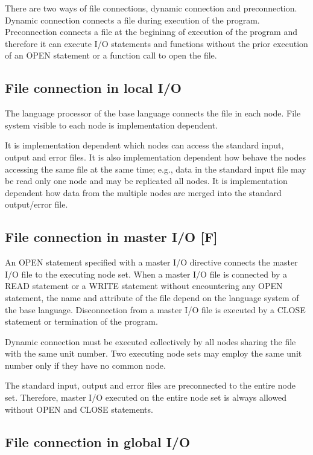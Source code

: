  There are two ways of file connections, dynamic connection and
  preconnection.
  Dynamic connection connects a file during execution of the program.
  Preconnection connects a file at the begininng of execution of the
  program and therefore it can execute I/O statements and functions
  without the prior execution of an OPEN statement or a function call to
  open the file.

  \subsection{File connection in local I/O}

  The language processor of the base language connects the file in each
  node.
  File system visible to each node is implementation dependent.

  It is implementation dependent which nodes can access the standard
  input, output and error files.
  It is also implementation dependent how behave the nodes accessing the
  same file at the same time; e.g., data in the standard input file may
  be read only one node and may be replicated all nodes.
  It is implementation dependent how data from the multiple nodes are
  merged into the standard output/error file.
  
  \subsection{File connection in master I/O [F]}

  An OPEN statement specified with a master I/O directive connects the
  master I/O file to the executing node set.
  When a master I/O file is connected by a READ statement or a WRITE
  statement without encountering any OPEN statement, the name and
  attribute of the file depend on the language system of the base
  language.
  Disconnection from a master I/O file is executed by a CLOSE statement
  or termination of the program.

  Dynamic connection must be executed collectively by all nodes sharing
  the file with the same unit number.
  Two executing node sets may employ the same unit number only if they
  have no common node.

  The standard input, output and error files are preconnected to the
  entire node set.
  Therefore, master I/O executed on the entire node set is always
  allowed without OPEN and CLOSE statements.


  \subsection{File connection in global I/O}

